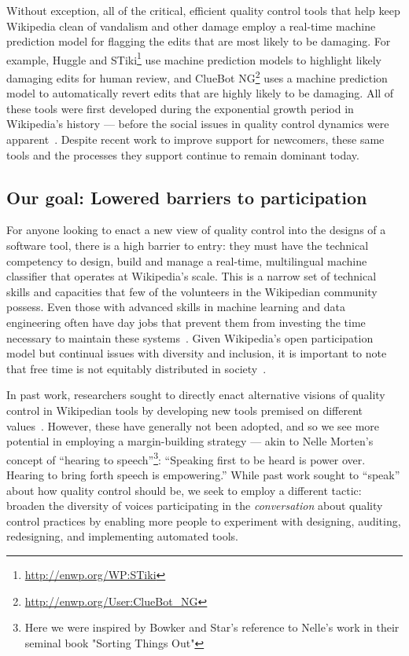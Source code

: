 Without exception, all of the critical, efficient quality control tools that help keep Wikipedia clean of vandalism and other damage employ a real-time machine prediction model for flagging the edits that are most likely to be damaging. For example, Huggle and STiki\footnote{\url{http://enwp.org/WP:STiki}} use machine prediction models to highlight likely damaging edits for human review, and ClueBot NG\footnote{\url{http://enwp.org/User:ClueBot_NG}} uses a machine prediction model to automatically revert edits that are highly likely to be damaging.  All of these tools were first developed during the exponential growth period in Wikipedia's history --- before the social issues in quality control dynamics were apparent~\cite{halfaker2013rise}. Despite recent work to improve support for newcomers, these same tools and the processes they support continue to remain dominant today.  

\subsection{Our goal: Lowered barriers to participation}
For anyone looking to enact a new view of quality control into the designs of a software tool, there is a high barrier to entry: they must have the technical competency to design, build and manage a real-time, multilingual machine classifier that operates at Wikipedia's scale.  This is a narrow set of technical skills and capacities that few of the volunteers in the Wikipedian community possess.  Even those with advanced skills in machine learning and data engineering often have day jobs that prevent them from investing the time necessary to maintain these systems~\cite{sculley2015hidden}. Given Wikipedia's open participation model but continual issues with diversity and inclusion, it is important to note that free time is not equitably distributed in society~\citep{Bianchi2010}. 

In past work, researchers sought to directly enact alternative visions of quality control in Wikipedian tools by developing new tools premised on different values~\cite{halfaker2014snuggle}. However, these have generally not been adopted, and so we see more potential in employing a margin-building strategy --- akin to Nelle Morten's concept of ``hearing to speech''\footnote{Here we were inspired by Bowker and Star's reference to Nelle's work in their seminal book "Sorting Things Out"\cite{bowker1999sorting}}\cite{morton1985journey}: ``Speaking first to be heard is power over. Hearing to bring forth speech is empowering.''  While past work sought to ``speak'' about how quality control should be, we seek to employ a different tactic: broaden the diversity of voices participating in the \emph{conversation} about quality control practices by enabling more people to experiment with designing, auditing, redesigning, and implementing automated tools. 

